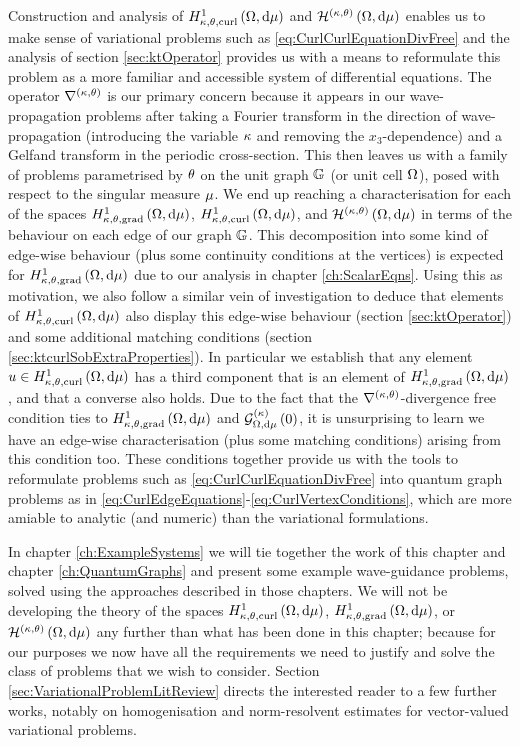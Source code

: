 Construction and analysis of $H^1_{\kappa,\theta,\mathrm{curl}}\left( \Omega, \mathrm{d}\mu \right)$ and $\mathcal{H}^{\left( \kappa, \theta \right)}\left( \Omega, \mathrm{d}\mu \right)$ enables us to make sense of variational problems such as \eqref{eq:CurlCurlEquationDivFree} and the analysis of section \ref{sec:ktOperator} provides us with a means to reformulate this problem as a more familiar and accessible system of differential equations.
The operator $\nabla^{\left( \kappa, \theta \right)}$ is our primary concern because it appears in our wave-propagation problems after taking a Fourier transform in the direction of wave-propagation (introducing the variable $\kappa$ and removing the $x_3$-dependence) and a Gelfand transform in the periodic cross-section.
This then leaves us with a family of problems parametrised by $\theta$ on the unit graph $\mathbb{G}$ (or unit cell $\Omega$), posed with respect to the singular measure $\mu$.
We end up reaching a characterisation for each of the spaces $H^1_{\kappa,\theta,\mathrm{grad}}\left( \Omega, \mathrm{d}\mu \right)$, $H^1_{\kappa,\theta,\mathrm{curl}}\left( \Omega, \mathrm{d}\mu \right)$, and $\mathcal{H}^{\left( \kappa, \theta \right)}\left( \Omega, \mathrm{d}\mu \right)$ in terms of the behaviour on each edge of our graph $\mathbb{G}$.
This decomposition into some kind of edge-wise behaviour (plus some continuity conditions at the vertices) is expected for $H^1_{\kappa,\theta,\mathrm{grad}}\left( \Omega, \mathrm{d}\mu \right)$ due to our analysis in chapter \ref{ch:ScalarEqns}.
Using this as motivation, we also follow a similar vein of investigation to deduce that elements of $H^1_{\kappa,\theta,\mathrm{curl}}\left( \Omega, \mathrm{d}\mu \right)$ also display this edge-wise behaviour (section \ref{sec:ktOperator}) and some additional matching conditions (section \ref{sec:ktcurlSobExtraProperties}).
In particular we establish that any element $u\in H^1_{\kappa,\theta,\mathrm{curl}}\left( \Omega, \mathrm{d}\mu \right)$ has a third component that is an element of $H^1_{\kappa,\theta,\mathrm{grad}}\left( \Omega, \mathrm{d}\mu \right)$, and that a converse also holds.
Due to the fact that the $\nabla^{\left( \kappa, \theta \right)}$-divergence free condition ties to $H^1_{\kappa,\theta,\mathrm{grad}}\left( \Omega, \mathrm{d}\mu \right)$ and $\mathcal{G}_{ \Omega, \mathrm{d}\mu}^{(\kappa)}\left( 0 \right)$, it is unsurprising to learn we have an edge-wise characterisation (plus some matching conditions) arising from this condition too.
These conditions together provide us with the tools to reformulate problems such as \eqref{eq:CurlCurlEquationDivFree} into quantum graph problems as in \eqref{eq:CurlEdgeEquations}-\eqref{eq:CurlVertexConditions}, which are more amiable to analytic (and numeric) than the variational formulations. \newline

In chapter \ref{ch:ExampleSystems} we will tie together the work of this chapter and chapter \ref{ch:QuantumGraphs} and present some example wave-guidance problems, solved using the approaches described in those chapters.
We will not be developing the theory of the spaces $H^1_{\kappa,\theta,\mathrm{curl}}\left( \Omega, \mathrm{d}\mu \right)$, $H^1_{\kappa,\theta,\mathrm{grad}}\left( \Omega, \mathrm{d}\mu \right)$, or $\mathcal{H}^{\left( \kappa, \theta \right)}\left( \Omega, \mathrm{d}\mu \right)$ any further than what has been done in this chapter; because for our purposes we now have all the requirements we need to justify and solve the class of problems that we wish to consider.
Section \ref{sec:VariationalProblemLitReview} directs the interested reader to a few further works, notably on homogenisation and norm-resolvent estimates for vector-valued variational problems.